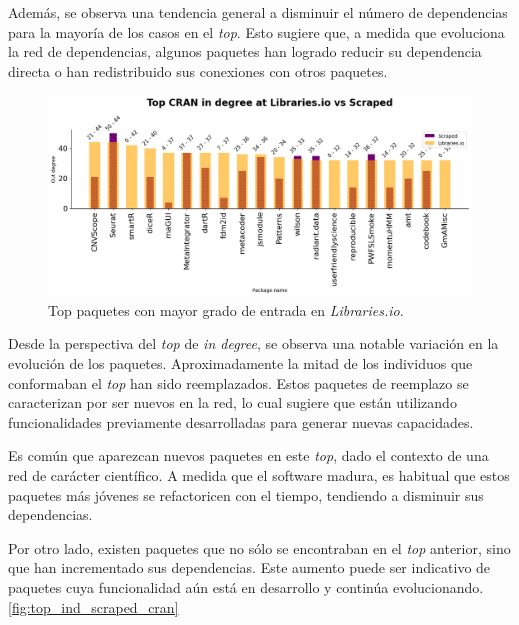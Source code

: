Además, se observa una tendencia general a disminuir el número de dependencias para la mayoría de
los casos en el \textit{top}. Esto sugiere que, a medida que evoluciona la red de dependencias,
algunos paquetes han logrado reducir su dependencia directa o han redistribuido sus conexiones
con otros paquetes.


\begin{figure}[ht!]
    \begin{center}
        \includegraphics[width=1\textwidth]{img/cran/top_ind_libio.png}
        \caption{Top paquetes con mayor grado de entrada en \textit{Libraries.io}.}
        \label{fig:top_ind_libio_cran}
    \end{center}
\end{figure}


Desde la perspectiva del \textit{top} de \textit{in degree}, se observa una notable variación en
la evolución de los paquetes. Aproximadamente la mitad de los individuos que conformaban el
\textit{top} han sido reemplazados. Estos paquetes de reemplazo se caracterizan por ser nuevos
en la red, lo cual sugiere que están utilizando funcionalidades previamente desarrolladas para
generar nuevas capacidades.

Es común que aparezcan nuevos paquetes en este \textit{top}, dado el contexto de una red de
carácter científico. A medida que el software madura, es habitual que estos paquetes más
jóvenes se refactoricen con el tiempo, tendiendo a disminuir sus dependencias.

Por otro lado, existen paquetes que no sólo se encontraban en el \textit{top} anterior,
sino que han incrementado sus dependencias. Este aumento puede ser indicativo de paquetes
cuya funcionalidad aún está en desarrollo y continúa evolucionando. \ref{fig:top_ind_scraped_cran}

